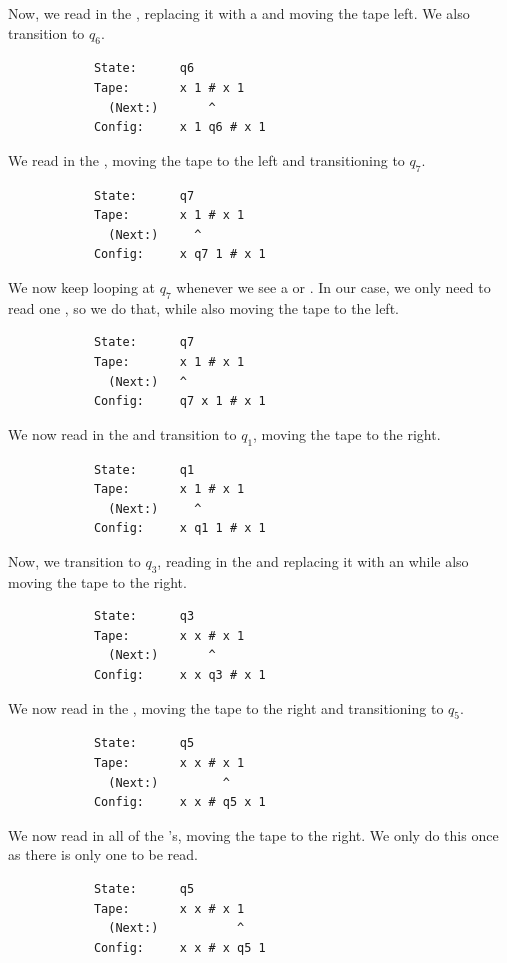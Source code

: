 \documentclass[letterpaper]{article}
\begin{document}
\begin{enumerate}
\begin{mdframed}[]
        Now, we read in the , replacing it with a  and moving the tape left. We also transition to $q_6$. 
        \begin{verbatim}
            State:      q6
            Tape:       x 1 # x 1
              (Next:)       ^
            Config:     x 1 q6 # x 1
        \end{verbatim}

        We read in the \code{\#}, moving the tape to the left and transitioning to $q_7$. 
        \begin{verbatim}
            State:      q7
            Tape:       x 1 # x 1
              (Next:)     ^
            Config:     x q7 1 # x 1
        \end{verbatim}

        We now keep looping at $q_7$ whenever we see a  or . In our case, we only need to read one , so we do that, while also moving the tape to the left. 
        \begin{verbatim}
            State:      q7
            Tape:       x 1 # x 1
              (Next:)   ^
            Config:     q7 x 1 # x 1
        \end{verbatim}

        We now read in the  and transition to $q_1$, moving the tape to the right. 
        \begin{verbatim}
            State:      q1
            Tape:       x 1 # x 1
              (Next:)     ^
            Config:     x q1 1 # x 1
        \end{verbatim}

        Now, we transition to $q_3$, reading in the  and replacing it with an  while also moving the tape to the right. 
        \begin{verbatim}
            State:      q3
            Tape:       x x # x 1
              (Next:)       ^
            Config:     x x q3 # x 1
        \end{verbatim}

        We now read in the \code{\#}, moving the tape to the right and transitioning to $q_5$.
        \begin{verbatim}
            State:      q5
            Tape:       x x # x 1
              (Next:)         ^
            Config:     x x # q5 x 1
        \end{verbatim}

        We now read in all of the 's, moving the tape to the right. We only do this once as there is only one  to be read. 
        \begin{verbatim}
            State:      q5
            Tape:       x x # x 1
              (Next:)           ^
            Config:     x x # x q5 1
        \end{verbatim}


\end{mdframed}
\end{enumerate}
\end{document}
